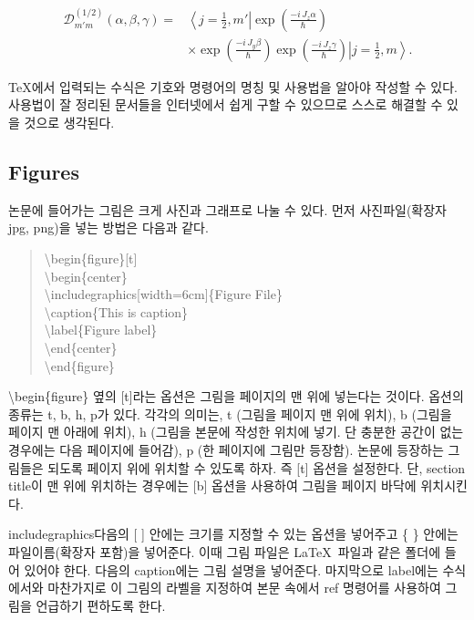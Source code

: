 \documentclass{gshs-report-v1.2}
\begin{document}
\begin{equation}
\begin{split}
\mathcal{D}_{m'm}^{(1/2)} (\alpha,\beta,\gamma)=&\left\langle j=\frac{1}{2},m'\right|\exp\left(\frac{-i\,J_z \alpha}{\hbar}\right)\\
&\times\exp\left(\frac{-i\,J_y \beta}{\hbar}\right)\exp\left(\frac{-i\,J_z \gamma}{\hbar}\right)\left| j=\frac{1}{2},m\right\rangle.
\end{split}
\label{eq004}
\end{equation}

\TeX 에서 입력되는 수식은 기호와 명령어의 명칭 및 사용법을 알아야 작성할 수 있다. 사용법이 잘 정리된 문서들을 인터넷에서 쉽게 구할 수 있으므로 스스로 해결할 수 있을 것으로 생각된다.


\subsection{Figures}
논문에 들어가는 그림은 크게 사진과 그래프로 나눌 수 있다. 먼저 사진파일(확장자 jpg, png)을 넣는 방법은 다음과 같다.
\begin{quote}
	{\textbackslash}begin\{figure\}[t]\\
	{\textbackslash}begin\{center\}\\
	{\textbackslash}includegraphics[width=6cm]\{Figure File\}\\
	{\textbackslash}caption\{This is caption\}\\
	{\textbackslash}label\{Figure label\}\\
	{\textbackslash}end\{center\}\\
	{\textbackslash}end\{figure\}
\end{quote}
{\textbackslash}begin\{figure\} 옆의 [t]라는 옵션은 그림을 페이지의 맨 위에 넣는다는 것이다. 옵션의 종류는 t, b, h, p가 있다. 각각의 의미는, t (그림을 페이지 맨 위에 위치), b (그림을 페이지 맨 아래에 위치), h (그림을 본문에 작성한 위치에 넣기. 단 충분한 공간이 없는 경우에는 다음 페이지에 들어감), p (한 페이지에 그림만 등장함). 논문에 등장하는 그림들은 되도록 페이지 위에 위치할 수 있도록 하자. 즉 [t] 옵션을 설정한다. 단, section title이 맨 위에 위치하는 경우에는 [b] 옵션을 사용하여 그림을 페이지 바닥에 위치시킨다.

includegraphics다음의 [ ] 안에는 크기를 지정할 수 있는 옵션을 넣어주고 \{ \} 안에는 파일이름(확장자 포함)을 넣어준다. 이때 그림 파일은 \LaTeX\ 파일과 같은 폴더에 들어 있어야 한다. 다음의 caption에는 그림 설명을 넣어준다. 마지막으로 label에는 수식에서와 마찬가지로 이 그림의 라벨을 지정하여 본문 속에서 ref 명령어를 사용하여 그림을 언급하기 편하도록 한다.
\end{document}
